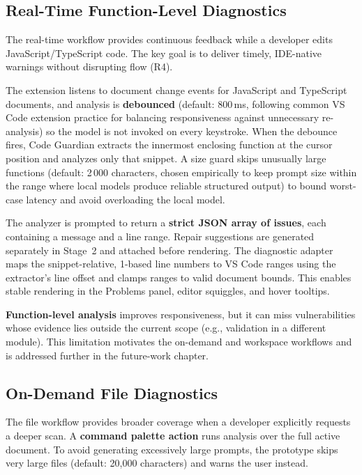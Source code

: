 \subsection{Real-Time Function-Level Diagnostics}
\label{subsec:inline-detection}

The real-time workflow provides continuous feedback while a developer edits JavaScript/TypeScript code. The key goal is to deliver timely, IDE-native warnings without disrupting flow (R4).

The extension listens to document change events for JavaScript and TypeScript documents, and analysis is \textbf{debounced} (default: 800\,ms, following common VS Code extension practice for balancing responsiveness against unnecessary re-analysis) so the model is not invoked on every keystroke. When the debounce fires, Code Guardian extracts the innermost enclosing function at the cursor position and analyzes only that snippet. A size guard skips unusually large functions (default: 2\,000 characters, chosen empirically to keep prompt size within the range where local models produce reliable structured output) to bound worst-case latency and avoid overloading the local model.

The analyzer is prompted to return a \textbf{strict JSON array of issues}, each containing a message and a line range. Repair suggestions are generated separately in Stage~2 and attached before rendering. The diagnostic adapter maps the snippet-relative, 1-based line numbers to VS Code ranges using the extractor's line offset and clamps ranges to valid document bounds. This enables stable rendering in the Problems panel, editor squiggles, and hover tooltips.

\textbf{Function-level analysis} improves responsiveness, but it can miss vulnerabilities whose evidence lies outside the current scope (e.g., validation in a different module). This limitation motivates the on-demand and workspace workflows and is addressed further in the future-work chapter.

\subsection{On-Demand File Diagnostics}
\label{subsec:comprehensive-analysis}

The file workflow provides broader coverage when a developer explicitly requests a deeper scan. A \textbf{command palette action} runs analysis over the full active document. To avoid generating excessively large prompts, the prototype skips very large files (default: 20{,}000 characters) and warns the user instead.

